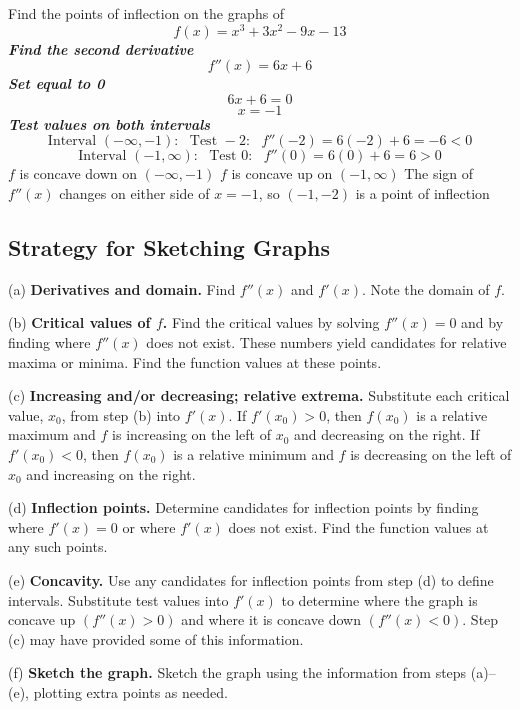 \documentclass{report}
\begin{document}
\pagebreak
\q
Find the points of inflection on the graphs of
$$f(x) = x^3 + 3x^2 -9x-13$$
\textit{\textbf{Find the second derivative}}
$$ f''(x) = 6x +6$$
\textit{\textbf{Set equal to 0}}
$$ 6x + 6=0$$
$$ x = -1$$
\textit{\textbf{Test values on both intervals}}
$$ \text{Interval } (-\infty, -1): \ \ \ \text{Test } -2: \ \ \ f''(-2) = 6(-2) + 6 = -6 < 0$$
$$ \text{Interval } (-1,\infty): \ \ \ \text{Test } 0: \ \ \ f''(0) = 6(0) + 6 = 6 > 0$$
\bigbreak \noindent
$f$ is concave down on $(-\infty, -1)$
\bigbreak \noindent
$f$ is concave up on $(-1,\infty)$
\bigbreak \noindent
The sign of $f''(x)$ changes on either side of $x = -1$, so $(-1,-2)$ is a point of inflection
\begin{mdframed}
  \subsection*{Strategy for Sketching Graphs} 
  \bigbreak \noindent
 \item[(a)] \textbf{Derivatives and domain.} Find $f''(x)$ and $f'(x)$. Note the domain of $f$.
    
    \item[(b)] \textbf{Critical values of $f$.} Find the critical values by solving $f''(x) = 0$ and by finding where $f''(x)$ does not exist. These numbers yield candidates for relative maxima or minima. Find the function values at these points.
    
    \item[(c)] \textbf{Increasing and/or decreasing; relative extrema.} Substitute each critical value, $x_0$, from step (b) into $f'(x)$. If $f'(x_0) > 0$, then $f(x_0)$ is a relative maximum and $f$ is increasing on the left of $x_0$ and decreasing on the right. If $f'(x_0) < 0$, then $f(x_0)$ is a relative minimum and $f$ is decreasing on the left of $x_0$ and increasing on the right.
    
    \item[(d)] \textbf{Inflection points.} Determine candidates for inflection points by finding where $f'(x) = 0$ or where $f'(x)$ does not exist. Find the function values at any such points.
    
    \item[(e)] \textbf{Concavity.} Use any candidates for inflection points from step (d) to define intervals. Substitute test values into $f'(x)$ to determine where the graph is concave up $(f''(x) > 0)$ and where it is concave down $(f''(x) < 0)$. Step (c) may have provided some of this information.
    \item[(f)] \textbf{Sketch the graph.} Sketch the graph using the information from steps (a)–(e), plotting extra points as needed.
\end{mdframed}
\end{document}
